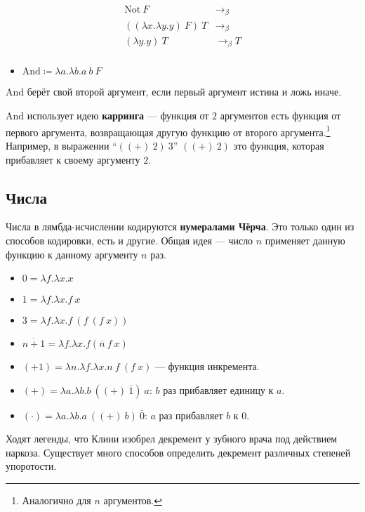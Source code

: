 \begin{align*}
    \mathrm{Not}\ F                 & \to_\beta   \\
    ((\lambda x.\lambda y.y)\ F)\ T & \to_\beta   \\
    (\lambda y.y)\ T                & \to_\beta T \\
\end{align*}

\begin{itemize}
    \item \(\mathrm{And} \coloneqq \lambda a.\lambda b.a\ b\ F\)
\end{itemize}

\(\mathrm{And}\) берёт свой второй аргумент, если первый аргумент истина и ложь иначе.

\(\mathrm{And}\) использует идею \textbf{карринга} --- функция от \(2\) аргументов есть функция от первого аргумента, возвращающая другую функцию от второго аргумента.\footnote{Аналогично для \(n\) аргументов.} Например, в выражении ``\(((+)\ 2)\ 3\)'' \(((+)\ 2)\) это функция, которая прибавляет к своему аргументу \(2\).

\subsection{Числа}

Числа в лямбда-исчислении кодируются \textbf{нумералами Чёрча}. Это только один из способов кодировки, есть и другие. Общая идея --- число \(n\) применяет данную функцию к данному аргументу \(n\) раз.
\begin{itemize}
    \item \(0 = \lambda f.\lambda x.x\)
    \item \(1 = \lambda f.\lambda x.f\ x\)
    \item \(3 = \lambda f.\lambda x.f\ (f\ (f\ x))\)
    \item \(\overline{n + 1} = \lambda f.\lambda x.f (\overline{n}\ f\ x)\)
    \item \(( + 1) = \lambda n.\lambda f.\lambda x.n\ f\ (f\ x)\) --- функция инкремента.
    \item \((+) = \lambda a.\lambda b.b\ ((+)\ \overline{1})\ a\): \(b\) раз прибавляет единицу к \(a\).
    \item \((\cdot) = \lambda a.\lambda b.a\ ((+)\ b)\ \overline{0}\): \(a\) раз прибавляет \(b\) к \(0\).
\end{itemize}

Ходят легенды, что Клини изобрел декремент у зубного врача под действием наркоза. Существует много способов определить декремент различных степеней упоротости.

